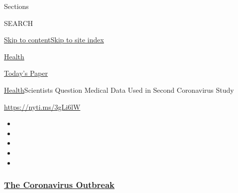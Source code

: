 Sections

SEARCH

\protect\hyperlink{site-content}{Skip to
content}\protect\hyperlink{site-index}{Skip to site index}

\href{https://www.nytimes3xbfgragh.onion/section/health}{Health}

\href{https://myaccount.nytimes3xbfgragh.onion/auth/login?response_type=cookie\&client_id=vi}{}

\href{https://www.nytimes3xbfgragh.onion/section/todayspaper}{Today's
Paper}

\href{/section/health}{Health}\textbar{}Scientists Question Medical Data
Used in Second Coronavirus Study

\url{https://nyti.ms/3gLi6lW}

\begin{itemize}
\item
\item
\item
\item
\item
\end{itemize}

\hypertarget{the-coronavirus-outbreak}{%
\subsubsection{\texorpdfstring{\href{https://www.nytimes3xbfgragh.onion/news-event/coronavirus?name=styln-coronavirus-national\&region=TOP_BANNER\&block=storyline_menu_recirc\&action=click\&pgtype=Article\&impression_id=bb6df570-f1e2-11ea-a641-3789e99198fa\&variant=undefined}{The
Coronavirus
Outbreak}}{The Coronavirus Outbreak}}\label{the-coronavirus-outbreak}}

